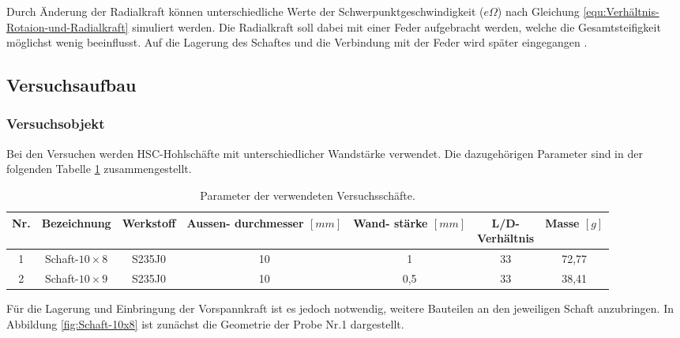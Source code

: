	Durch Änderung der Radialkraft können unterschiedliche Werte der Schwerpunktgeschwindigkeit ($e \Omega$) nach Gleichung \ref{equ:Verhältnis-Rotaion-und-Radialkraft} simuliert werden. Die Radialkraft soll dabei mit einer Feder aufgebracht werden, welche die Gesamtsteifigkeit möglichst wenig beeinflusst. Auf die Lagerung des Schaftes und die Verbindung mit der Feder wird später eingegangen \cite{Kokavecz2010}.
	
	\subsection{Versuchsaufbau}\label{sec:Versuchsaufbau}
	
	\subsubsection{Versuchsobjekt}\label{sec:Versuchsobjekt}
	Bei den Versuchen werden HSC-Hohlschäfte mit unterschiedlicher Wandstärke verwendet. Die dazugehörigen Parameter sind in der folgenden Tabelle \ref{tab:Datentabelle-Schaft} zusammengestellt.
	
	\begin{table}[H]\label{tab:Datentabelle-Schaft}
		\centering
		\begin{tabular}{|c|c|c|c|c|c|c|}
			\hline
		    Nr.     & Bezeichnung  & Werkstoff  & \makecell[c]{Aussen-\\durchmesser\\$  [mm] $}  & \makecell[c]{Wand-\\stärke\\$  [mm] $} & \makecell[c]{L/D-\\ Verhältnis} & \makecell[c]{Masse\\$  [g] $}\\
			\hline
		 	1       & Schaft-$ 10\times8 $     & S235J0   & 10          & 1      & 33       & 72,77 \\
			\hline
			2       & Schaft-$ 10\times9  $    & S235J0   & 10          & 0,5    & 33       & 38,41\\
			\hline	 
		\end{tabular}%
		\caption{Parameter der verwendeten Versuchsschäfte.}
	\end{table}
		Für die Lagerung und Einbringung der Vorspannkraft ist es jedoch notwendig, weitere Bauteilen an den jeweiligen Schaft anzubringen. In Abbildung \ref{fig:Schaft-10x8} ist zunächst die Geometrie der Probe Nr.1 dargestellt. 
	
